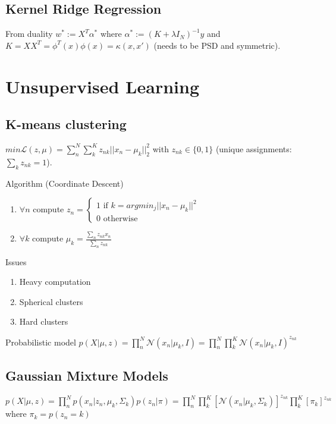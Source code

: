 \subsection{Kernel Ridge Regression}
From duality $w^* := X^T \alpha^*$ where $\alpha^* := (K + \lambda I_N)^{-1}y$ and $K=XX^T = \phi^T(x) \phi(x) = \kappa(x,x')$ (needs to be PSD and symmetric).


\section{Unsupervised Learning}
\subsection{K-means clustering}

$min \mathcal{L}(z,\mu) = \sum_n^N \sum_k^K z_{nk} ||x_n - \mu_k||^2_2$ with $z_{nk} \in \{0,1\}$ (unique assignments: $\sum_k z_{nk} = 1$).

Algorithm (Coordinate Descent)
\begin{enumerate}
\item $\forall n$ compute $z_n = \begin{cases}
	1 \text{ if } k = argmin_j || x_n - \mu_k||^2 \\
	0 \text{ otherwise }
   \end{cases}$
\item $\forall k$ compute $\mu_k = \frac{\sum_n z_{nk} x_n}{\sum_n z_{nk}}$
\end{enumerate}

Issues
\begin{enumerate}
	\item Heavy computation
	\item Spherical clusters
	\item Hard clusters
\end{enumerate}

Probabilistic model
$p(X|\mu,z) = \prod_n^N \mathcal{N}(x_n|\mu_k,I) = \prod_n^N \prod_k^K \mathcal{N}(x_n|\mu_k,I)^{z_{nk}}$

\subsection{Gaussian Mixture Models}
$p(X|\mu,z) = \prod_n^N p(x_n|z_n,\mu_k,\Sigma_k)p(z_n|\pi)
= \prod_n^N \prod_k^K [\mathcal{N}(x_n|\mu_k,\Sigma_k)]^{z_{nk}} \prod_k^K [\pi_k]^{z_{nk}}$ where $\pi_k = p(z_n=k)$

